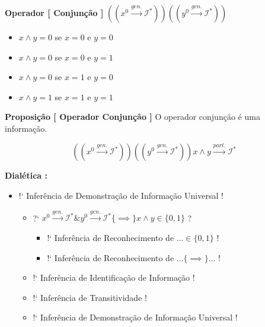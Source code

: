 \documentclass[10pt,a4paper]{report}
\begin{document}
\hspace{\baselineskip}

\textbf{Operador [ Conjunção ]} $ (( x^0 \overset{gen.}{\rightarrow} \mathcal{I}^* )) (( y^0 \overset{gen.}{\rightarrow} \mathcal{I}^* )) $

\begin{itemize}
	\item[ (i) ] $x \wedge y = 0$ se $x=0$ e $y=0$	
	\item[ (ii) ] $x \wedge y = 0$ se $x=0$ e $y=1$
	\item[ (iii) ] $x \wedge y = 0$ se $x=1$ e $y=0$
	\item[ (iv) ] $ x \wedge y = 1$ se $x=1$ e $y=1$
\end{itemize}


\hspace{\baselineskip}

\textbf{Proposição [ Operador Conjunção ]} O operador conjunção é uma informação.

$$ (( x^0 \overset{gen.}{\rightarrow} \mathcal{I}^* )) (( y^0 \overset{gen.}{\rightarrow} \mathcal{I}^* )) x \wedge y \overset{part.}{\rightarrow} \mathcal{I}^* $$

\textbf{Dialética :}

\begin{itemize}
	\item[ ] !` Inferência de Demonstração de Informação Universal !
	\begin{itemize}
		\item[ ] ?` $ x^0 \overset{gen.}{\rightarrow} \mathcal{I}^* \& y^0 \overset{gen.}{\rightarrow} \mathcal{I}^* \{ \implies \} x\wedge y \in \{0,1\} $ ?
		\begin{itemize}
			\item[ ] !` Inferência de Reconhecimento de $ \dots \in \{ 0,1 \}$ !
			\item[ ] !` Inferência de Reconhecimento de $ \dots \{\implies \} \dots $ !
		\end{itemize}
		\item[ ] !` Inferência de Identificação de Informação !
		\item[ ] !` Inferência de Transitividade !
		\item[ ] !` Inferência de Demonstração de Informação Universal !
	\end{itemize}
\end{itemize}
\end{document}
